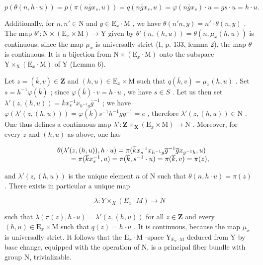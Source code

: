 \[
p (\theta (n, h \cdot u)) = p (\pi (n \overline {{g}} x _ {s}, u)) = q (n \overline {{g}} x _ {s}, u) = \varphi (n \overline {{g}} x _ {s}) \cdot u = g s \cdot u = h \cdot u.
\]

Additionally, for \(n, n' \in \mathrm{N}\) and \(y \in \mathrm{E}_x \cdot \mathrm{M}\) , we have \(\theta(n'n, y) = n' \cdot \theta(n, y)\) . The map \(\theta'\colon \mathrm{N} \times (\mathrm{E}_x \times \mathrm{M}) \to \mathrm{Y}\) given by \(\theta'(n, (h, u)) = \theta(n, \mu_x(h, u))\) is continuous; since the map \(\mu_x\) is universally strict (I, p. 133, lemma 2), the map \(\theta\) is continuous. It is a bijection from \(\mathrm{N} \times (\mathrm{E}_x \cdot \mathrm{M})\) onto the subspace \(\mathrm{Y} \times_{\mathrm{X}} (\mathrm{E}_x \cdot \mathrm{M})\) of Y (Lemma 6).

Let \(z = (\overline{k}, v) \in \mathbf{Z}\) and \((h, u) \in \mathrm{E}_x \times \mathrm{M}\) such that \(q(\overline{k}, v) = \mu_x(h, u)\) . Set \(s = h^{-1}\varphi(\overline{k})\) ; since \(\varphi(\overline{k}) \cdot v = h \cdot u\) , we have \(s \in S\) . Let us then set \(\lambda'(z, (h, u)) = \overline{k} x_s^{-1} x_{h^{-1}g} \overline{g}^{-1}\) ; we have \(\varphi(\lambda'(z, (h, u))) = \varphi(\overline{k}) s^{-1} h^{-1} gg^{-1} = e\) , therefore \(\lambda'(z, (h, u)) \in \mathrm{N}\) . One thus defines a continuous map \(\lambda' \colon \mathbf{Z} \times_{\mathbf{X}} (\mathrm{E}_x \times \mathrm{M}) \to \mathrm{N}\) . Moreover, for every \(z\) and \((h, u)\) as above, one has

\[
\begin{array}{r l} & {\theta (\lambda^ {\prime} (z, (h, u)), h \cdot u) = \pi (\overline {{k}} x _ {s} ^ {- 1} x _ {h ^ {- 1} g} \overline {{g}} ^ {- 1} \overline {{g}} x _ {g ^ {- 1} h}, u)} \\ & {\qquad = \pi (\overline {{k}} x _ {s} ^ {- 1}, u) = \pi (\overline {{k}}, s ^ {- 1} \cdot u) = \pi (\overline {{k}}, v) = \pi (z),} \end{array}
\]

and \(\lambda'(z,(h,u))\) is the unique element \(n\) of N such that \(\theta(n,h\cdot u)=\pi(z)\) . There exists in particular a unique map

\[
\lambda \colon Y \times_ {X} (E _ {x} \cdot M) \to N
\]

such that \(\lambda(\pi(z), h \cdot u) = \lambda'(z, (h, u))\) for all \(z \in \mathbf{Z}\) and every \((h, u) \in \mathrm{E}_x \times \mathrm{M}\) such that \(q(z) = h \cdot u\) . It is continuous, because the map \(\mu_x\) is universally strict. It follows that the \(\mathrm{E}_x \cdot \mathrm{M}\) -space \(\mathrm{Y}_{\mathrm{E}_x \cdot \mathrm{M}}\) deduced from Y by base change, equipped with the operation of N, is a principal fiber bundle with group N, trivializable.

